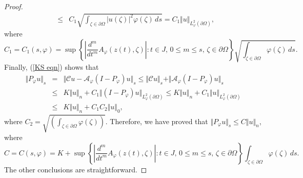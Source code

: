 \documentclass[11pt, reqno]{amsart}
\numberwithin{equation}{section}
\begin{document}
\begin{proof}
\begin{eqnarray*}
&\leq&
C_1\sqrt{\int_{\zeta\in\partial\Omega}\vert u(\zeta)\vert^2\varphi(\zeta)\,ds}
=
C_1\Vert u\Vert_{L^2_{\varphi}(\partial\Omega)},
\end{eqnarray*}
where
\[
C_1
=
C_1(s,\varphi)
=
\sup\left\lbrace\left\lvert \frac{d^m}{dt^m} A_{\varphi}(z(t),\zeta) \right\rvert:t\in J,\,0\leq m\leq s,\,\zeta\in\partial\Omega\right\rbrace 
\sqrt{\int_{\zeta\in\partial\Omega}\varphi(\zeta)\,ds}.
\]
Finally, (\ref{KS eqn}) shows that 
\begin{eqnarray*}
\Vert P_{\varphi}u\Vert_s
&=&
\Vert \mathcal{C}u -\mathcal{A}_{\varphi}(I-P_{\varphi})u\Vert_s
\leq 
\Vert\mathcal{C}u\Vert_s + \Vert \mathcal{A}_{\varphi}(I-P_{\varphi})u\Vert_s
\\
&\leq&
K\Vert u\Vert_n +C_1\Vert (I-P_{\varphi})u\Vert_{L^2_{\varphi}(\partial\Omega)}
\leq
K\Vert u\Vert_n +C_1\Vert u\Vert_{L^2_{\varphi}(\partial\Omega)}\\
&\leq&
K\Vert u\Vert_n +C_1 C_2\Vert u\Vert_0,
\end{eqnarray*}
where $C_2=\sqrt{\left(\int_{\zeta\in\partial\Omega}\varphi(\zeta)\right)}$. Therefore, we have proved that $\Vert P_{\varphi}u\Vert_s\leq C\Vert u\Vert_n$, where
\begin{equation}
C=C(s,\varphi)
=
K+
\sup\left\lbrace\left\lvert \frac{d^m}{dt^m} A_{\varphi}(z(t),\zeta) \right\rvert:t\in J,\,0\leq m\leq s,\,\zeta\in\partial\Omega\right\rbrace 
\int_{\zeta\in\partial\Omega}\varphi(\zeta)\,ds.
\end{equation}
The other conclusions are straightforward.
\end{proof}
\end{document}
